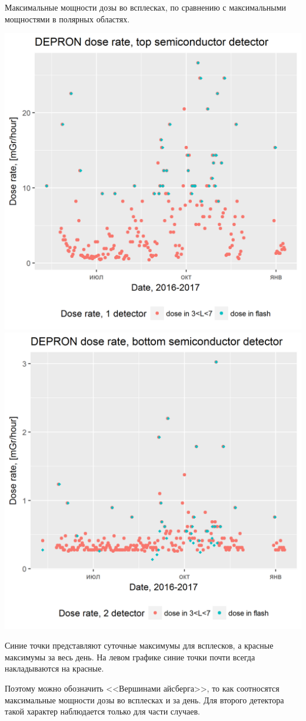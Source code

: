 \documentclass[t, aspectratio=43]{beamer}
\begin{document}
\begin{frame}	
\frametitle{\insertsection} 
Максимальные мощности дозы во всплесках, по сравнению с максимальными мощностями в полярных областях. 


\begin{center}
	\includegraphics[width=0.5\linewidth]{images/resmaxpolarflash}
	\includegraphics[width=0.5\linewidth]{images/resmaxpolarflash2}
\end{center}
{\tiny 
Синие точки представляют суточные максимумы для всплесков, а красные максимумы за весь день. На левом графике синие точки почти всегда накладываются на красные.

Поэтому  можно обозначить <<Вершинами айсберга>>, то как соотносятся максимальные мощности дозы во всплесках и за день. Для второго детектора такой характер наблюдается только для части случаев. }

\end{frame}
\end{document}
